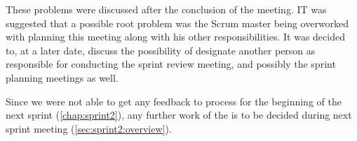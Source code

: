 These problems were discussed after the conclusion of the meeting. 
IT was suggested that a possible root problem was the \giraf Scrum master being overworked with planning this meeting along with his other responsibilities.
It was decided to, at a later date, discuss the possibility of designate another person as responsible for conducting the sprint review meeting, and possibly the sprint planning meetings as well.

Since we were not able to get any feedback to process for the beginning of the next sprint (\cref{chap:sprint2}), any further work of the \launcher is to be decided during next sprint meeting (\cref{sec:sprint2:overview}).